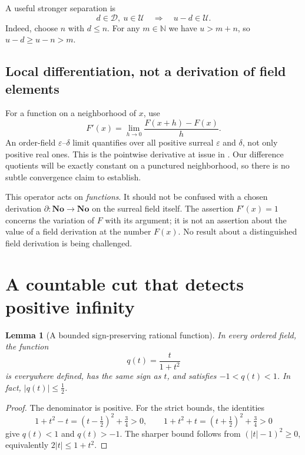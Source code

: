 \documentclass[11pt,letterpaper]{article}
\numberwithin{equation}{section}
\newtheorem{lemma}[theorem]{Lemma}
\theoremstyle{definition}
\theoremstyle{remark}
\newcommand{\No}{\mathbf{No}}
\newcommand{\N}{\mathbb{N}}
\newcommand{\U}{\mathcal{U}}
\newcommand{\D}{\mathcal{D}}
\newcommand{\source}[2]{\cite[#1]{#2}}
\begin{document}
A useful stronger separation is
\begin{equation}\label{eq:crossgap}
 d\in\D,\ u\in\U\quad\Longrightarrow\quad u-d\in\U.
\end{equation}
Indeed, choose $n$ with $d\le n$. For any $m\in\N$ we have
$u>m+n$, so $u-d\ge u-n>m$.

\subsection{Local differentiation, not a derivation of field elements}
For a function on a neighborhood of $x$, use
\begin{equation}\label{eq:derivative}
 F'(x)=\lim_{h\to0}\frac{F(x+h)-F(x)}{h}.
\end{equation}
An order-field $\varepsilon$--$\delta$ limit quantifies over all positive
surreal $\varepsilon$ and $\delta$, not only positive real ones. This is
the pointwise derivative at issue in \source{Section~5}{RSS}. Our difference
quotients will be exactly constant on a punctured neighborhood, so there is
no subtle convergence claim to establish.

This operator acts on \emph{functions}. It should not be confused with a
chosen derivation $\partial:\No\to\No$ on the surreal field itself.
The assertion $F'(x)=1$ concerns the variation of $F$ with its argument;
it is not an assertion about the value of a field derivation at the number
$F(x)$. No result about a distinguished field derivation is being challenged.

\section{A countable cut that detects positive infinity}\label{sec:cut}
\begin{lemma}[A bounded sign-preserving rational function]\label{lem:q}
In every ordered field, the function
\begin{equation}\label{eq:q}
 q(t)=\frac{t}{1+t^2}
\end{equation}
is everywhere defined, has the same sign as $t$, and satisfies
$-1<q(t)<1$. In fact, $|q(t)|\le\tfrac12$.
\end{lemma}
\begin{proof}
The denominator is positive. For the strict bounds, the identities
\[
 1+t^2-t=(t-\tfrac12)^2+\tfrac34>0,\qquad
 1+t^2+t=(t+\tfrac12)^2+\tfrac34>0
\]
give $q(t)<1$ and $q(t)>-1$. The sharper bound follows from
$(|t|-1)^2\ge0$, equivalently $2|t|\le1+t^2$.
\end{proof}
\end{document}
